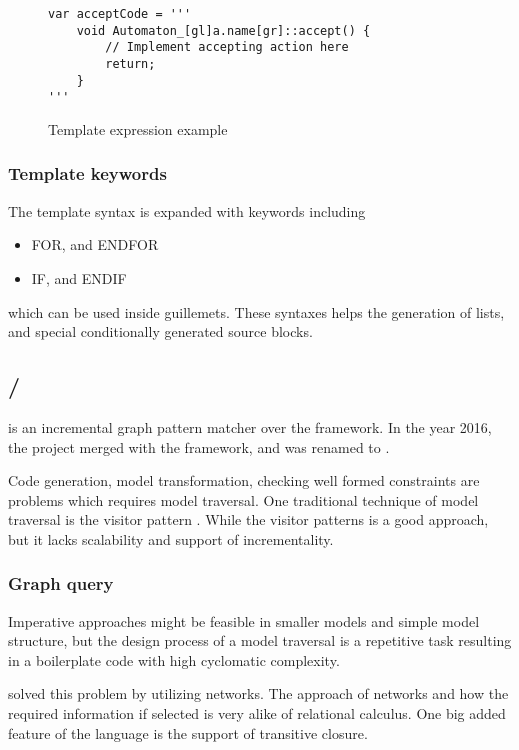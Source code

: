 \begin{figure}
	\centering
	\begin{lstlisting}[style=xtext]
var acceptCode = '''
	void Automaton_[gl]a.name[gr]::accept() {
		// Implement accepting action here
		return;
	}
'''
	\end{lstlisting}
	\caption{Template expression example}
	\label{fig:template_expression_example}
\end{figure}

\subsubsection{Template keywords}

The template syntax is expanded with keywords including
\begin{itemize}
	\item FOR, and ENDFOR
	\item IF, and ENDIF
\end{itemize}
which can be used inside guillemets. These syntaxes helps the generation of lists, and special conditionally generated source blocks.

\subsection{\viatraq/\incq}

\viatraq \citep{ujhelyi2015emf} is an incremental graph pattern matcher over the \emf framework. In the year 2016, the project merged with the \viatra framework, and \incq was renamed to \viatraq.

Code generation, model transformation, checking well formed constraints are problems which requires model traversal. One traditional technique of model traversal is the visitor pattern \citep{gamma1995design}. While the visitor patterns is a good approach, but it lacks scalability and support of incrementality.

\subsubsection{Graph query}

Imperative approaches might be feasible in smaller models and simple model structure, but the design process of a model traversal is a repetitive task resulting in a boilerplate code with high cyclomatic complexity.

\viatraq solved this problem by utilizing \rete networks. The approach of \rete networks and how the required information if selected is very alike of relational calculus. One big added feature of the language is the support of transitive closure.

